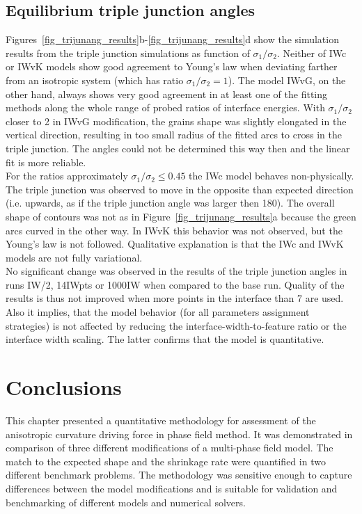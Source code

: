 \subsection{Equilibrium triple junction angles}\label{subsec_paper1_results_trijun}
Figures~\ref{fig_trijunang_results}b-\ref{fig_trijunang_results}d show the simulation results from the triple junction simulations as function of $\sigma_1/\sigma_2$. Neither of IWc or IWvK models show good agreement to Young's law when deviating farther from an isotropic system (which has ratio $\sigma_1/\sigma_2=1$). The model IWvG, on the other hand, always shows very good agreement in at least one of the fitting methods along the whole range of probed ratios of interface energies. With $\sigma_1/\sigma_2$ closer to 2 in IWvG modification, the grains shape was slightly elongated in the vertical direction, resulting in too small radius of the fitted arcs to cross in the triple junction. The angles could not be determined this way then and the linear fit is more reliable. \\
For the ratios approximately $\sigma_1/\sigma_2\leq0.45$ the IWc model behaves non-physically. The triple junction was observed to move in the opposite than expected direction (i.e. upwards, as if the triple junction angle was larger then 180\textdegree). The overall shape of contours was not as in Figure~\ref{fig_trijunang_results}a because the green arcs curved in the other way. In IWvK this behavior was not observed, but the Young's law is not followed. Qualitative explanation is that the IWc and IWvK models are not fully variational. \\
No significant change was observed in the results of the triple junction angles in runs IW/2, 14IWpts or 1000IW when compared to the base run. Quality of the results is thus not improved when more points in the interface than 7 are used. Also it implies, that the model behavior (for all parameters assignment strategies) is not affected by reducing the interface-width-to-feature ratio or the interface width scaling. The latter confirms that the model is quantitative.

\section{Conclusions}
This chapter presented a quantitative methodology for assessment of the anisotropic curvature driving force in phase field method. It was demonstrated in comparison of three different modifications of a multi-phase field model. The match to the expected shape and the shrinkage rate were quantified in two different benchmark problems. The methodology was sensitive enough to capture differences between the model modifications and is suitable for validation and benchmarking of different models and numerical solvers.

